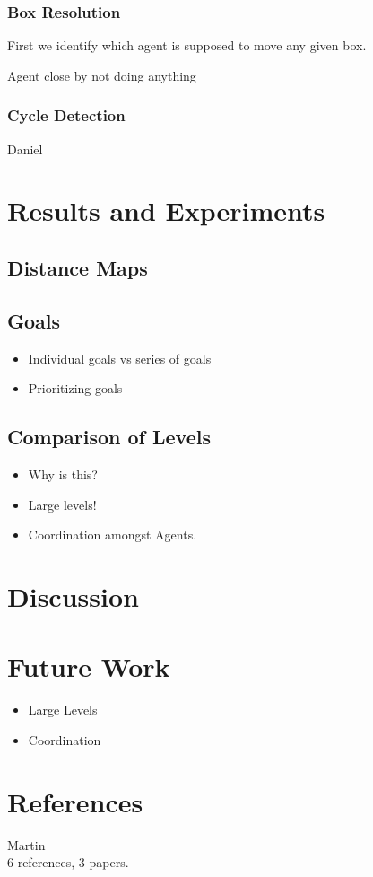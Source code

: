 \documentclass[10pt,a4paper]{article}
\begin{document}
		\subsubsection{Box Resolution}
			First we identify which agent is supposed to move any given box.  

			Agent close by not doing anything






		\subsubsection{Cycle Detection}

		Daniel

\section{Results and Experiments}
	\subsection{Distance Maps}
	\subsection{Goals}
		\begin{itemize}
			\item{Individual goals vs series of goals}
			\item{Prioritizing goals}
		\end{itemize}

	\subsection{Comparison of Levels}
		\begin{itemize}
			\item{Why is this?}
			\item{Large levels!}
			\item{Coordination amongst Agents.}
		\end{itemize}

\section{Discussion}

\section{Future Work}
	\begin{itemize}
		\item{Large Levels}
		\item{Coordination}
	\end{itemize}

\section{References}
	Martin\\
	6 references, 3 papers.
		
		


\end{document}
